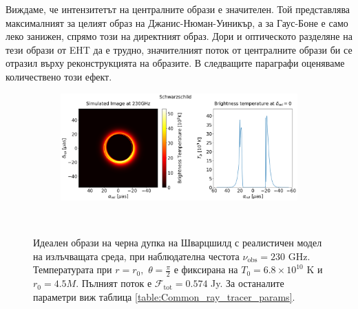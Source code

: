 \documentclass[12pt]{article}
\numberwithin{equation}{section}
\numberwithin{figure}{section}
\begin{document}
	 Виждаме, че интензитетът на централните образи е значителен. Той представлява максималният за целият образ на Джанис-Нюман-Уиникър, а за Гаус-Боне е само леко занижен, спрямо този на директният образ. Дори и оптическото разделяне на тези образи от EHT да е трудно, значителният поток от централните образи би се отразил върху реконструкцията на образите. В следващите параграфи оценяваме количествено този ефект.
	
	\newpage
	
	\begin{figure}[h!]
		\centering
		\begin{subfigure}{12cm}
			\hspace{-0cm}
			\includegraphics[scale = 0.25]{Section_8_Observing_Horizonless_Objects/Ray_tracer_plot_230_Sch.png}
		\end{subfigure}\\
		\label{Kerr_Ray_tracer_230}
		\caption[Идеален образ на черна дупки на Шварцшилд с реалистичен модел на излъчващата среда, при наблюдателна честота $\nu_\text{obs} = 230$ GHz]{\small Идеален образи на черна дупка на Шварцшилд с реалистичен модел на излъчващата среда, при наблюдателна честота $\nu_\text{obs} = 230$ GHz. Температурата при $r = r_0,\,\,\theta = \frac{\pi}{2}$ е фиксирана на $T_0 = 6.8\times10^{10}$ K и $r_0 = 4.5M$. Пълният поток е $\mathcal{F}_{\text{tot}} = 0.574$ Jy. За останалите параметри виж таблица \ref{table:Common_ray_tracer_params}.} 
	\end{figure}
	
\end{document}
